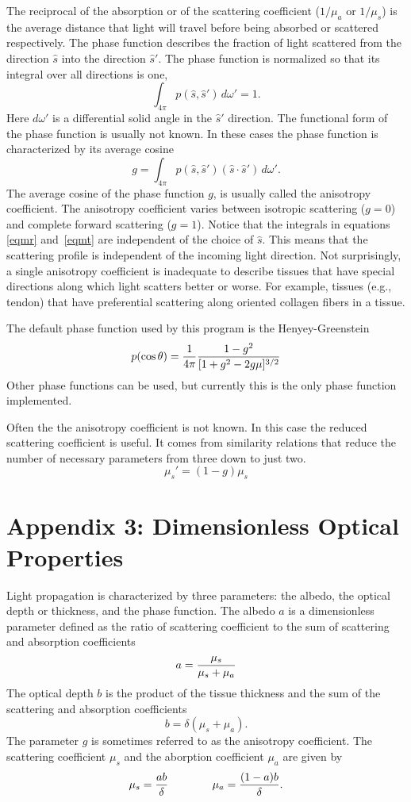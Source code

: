 \documentclass{article}
\begin{document}
\noindent
The reciprocal of the absorption or of the scattering coefficient ($1/\mu_a$ or
$1/\mu_s$) is the average distance that light will travel before being absorbed or
scattered respectively.  The phase function describes the fraction of light
scattered from the direction $\hat{s}$ into the direction $\hat{s}'$.  The
phase
function is normalized so that its integral over all directions is one,
$$
\int_{4\pi} p(\hat{s}, \hat{s}') \, d\omega' = 1.
$$
Here $d\omega'$ is a differential solid angle in the $\hat{s}'$ direction.  The
functional form of the phase function is usually not known.  In these cases the
phase function is characterized by its average cosine
$$
g=\int_{4\pi} p(\hat{s}, \hat{s}') (\hat{s} \cdot \hat{s}') \, d\omega'.
$$
The average cosine of the phase function $g$, is usually called the
anisotropy coefficient.  The anisotropy coefficient varies between
isotropic scattering ($g=0$) and complete forward scattering ($g=1$). 
Notice that the integrals in equations \ref{eqmr} and~\ref{eqmt} are independent of the
choice of $\hat{s}$.  This means that the scattering profile is
independent of the incoming light direction.  Not surprisingly, a single
anisotropy coefficient is inadequate to describe tissues that have
special directions along which light scatters better or worse.  For example,
tissues (e.g., tendon) that have preferential scattering along oriented
collagen fibers in a tissue.  

The default phase function used by this program is the Henyey-Greenstein
$$
p(\cos\theta) = {1\over4\pi}{1-g^2\over[1 + g^2 - 2g\mu]^{3/2}}
$$
Other phase functions can be used, but currently this is the only phase
function implemented.

Often the the anisotropy
coefficient is not known.  In this case the reduced scattering coefficient
is useful.  It comes from similarity relations that 
reduce the number of necessary parameters
from three down to just two.  
$$
\mu_s' = (1-g)\mu_s
$$

\section*{Appendix 3: Dimensionless Optical Properties}

Light propagation is characterized by three parameters: the albedo, the
optical depth or thickness, and the phase function.  The albedo $a$ is a
dimensionless parameter defined as the ratio of scattering coefficient to
the sum of scattering and absorption coefficients
$$
a = {\mu_s \over \mu_s+\mu_a}
$$
The optical depth $b$ is the product of the tissue thickness and the
sum of the scattering and absorption coefficients
$$
b=\delta (\mu_s+\mu_a).
$$
The parameter $g$ is sometimes referred to as the anisotropy coefficient.
The scattering coefficient $\mu_s$ and the aborption coefficient $\mu_a$ are
given by
$$
\mu_s = {a b \over \delta} \qquad \qquad \mu_a={(1-a)b \over \delta}.
$$
\end{document}
